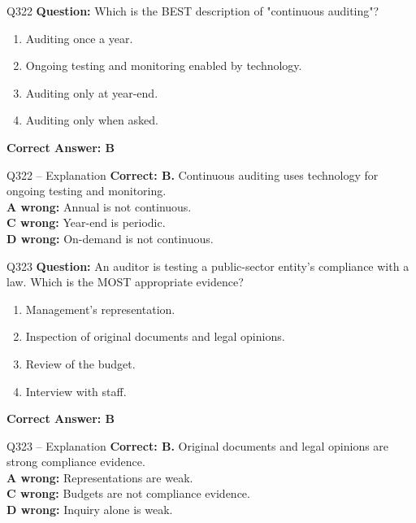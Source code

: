 \documentclass[aspectratio=169,10pt]{beamer}
\begin{document}
	\begin{frame}[t]{Q322}
		\small
		\textbf{Question:} Which is the BEST description of "continuous auditing"?
		\begin{enumerate}[label=\Alph*.,itemsep=1pt,topsep=2pt]
			\item Auditing once a year.
			\item Ongoing testing and monitoring enabled by technology.
			\item Auditing only at year-end.
			\item Auditing only when asked.
		\end{enumerate}
		\vspace{4pt}
		\textbf{Correct Answer: B}
	\end{frame}
	
	\begin{frame}[t]{Q322 -- Explanation}
		\small
		\textbf{Correct: B.} Continuous auditing uses technology for ongoing testing and monitoring. \\[4pt]
		\textbf{A wrong:} Annual is not continuous. \\[2pt]
		\textbf{C wrong:} Year-end is periodic. \\[2pt]
		\textbf{D wrong:} On-demand is not continuous.
	\end{frame}
	
	\begin{frame}[t]{Q323}
		\small
		\textbf{Question:} An auditor is testing a public-sector entity's compliance with a law. Which is the MOST appropriate evidence?
		\begin{enumerate}[label=\Alph*.,itemsep=1pt,topsep=2pt]
			\item Management's representation.
			\item Inspection of original documents and legal opinions.
			\item Review of the budget.
			\item Interview with staff.
		\end{enumerate}
		\vspace{4pt}
		\textbf{Correct Answer: B}
	\end{frame}
	
	\begin{frame}[t]{Q323 -- Explanation}
		\small
		\textbf{Correct: B.} Original documents and legal opinions are strong compliance evidence. \\[4pt]
		\textbf{A wrong:} Representations are weak. \\[2pt]
		\textbf{C wrong:} Budgets are not compliance evidence. \\[2pt]
		\textbf{D wrong:} Inquiry alone is weak.
	\end{frame}
	
\end{document}
